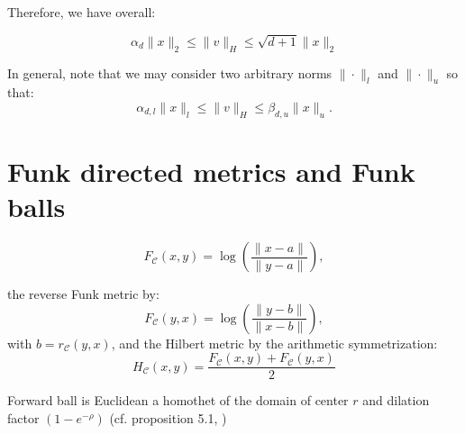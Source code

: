 \documentclass[graybox]{svmult}
\def\calC{\mathcal{C}}
\begin{document}
Therefore, we have overall:

$$
\alpha_d \|x\|_2 \leq \|v\|_H \leq \sqrt{d+1} \|x\|_2
$$

In general, note that we may consider two arbitrary norms $\|\cdot\|_l$ 
and $\|\cdot\|_u$ so that:
$$
\alpha_{d,l} \|x\|_l \leq \|v\|_H \leq \beta_{d,u} \|x\|_u.
$$

\section{Funk directed metrics and Funk balls}
$$
F_\calC(x,y) = \log\left( \frac{\|x-a\|}{\|y-a\|} \right),
$$

the reverse Funk metric by:
$$
F_\calC(y,x) = \log\left( \frac{\|y-b\|}{\|x-b\|} \right),
$$
with $b=r_\calC(y,x)$,
and the Hilbert metric by the arithmetic symmetrization:
$$
H_\calC(x,y)=\frac{F_\calC(x,y)+F_\calC(y,x)}{2}
$$

Forward ball is Euclidean a homothet of the domain of center $r$ and dilation factor $(1 - e^{-\rho})$ (cf. proposition 5.1, \cite{FunkHilbert-2014})
\end{document}
